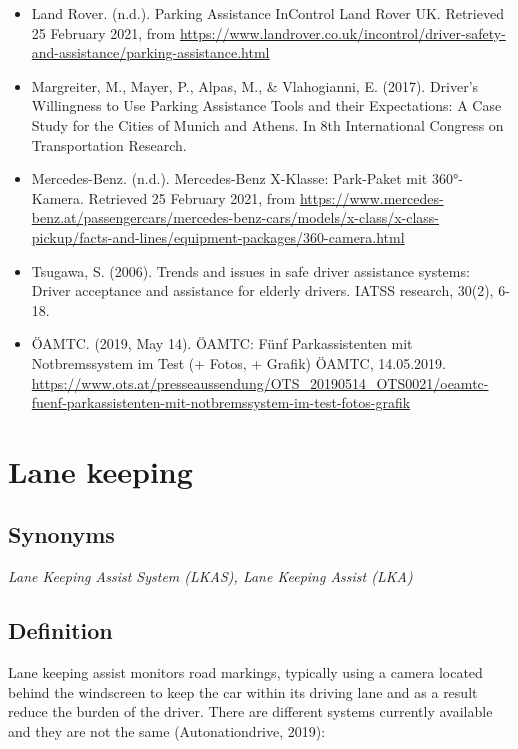 \documentclass[
]{book}
\begin{document}
\begin{itemize}
\item
  Land Rover. (n.d.). Parking Assistance \textbar{} InControl \textbar{} Land Rover UK. Retrieved 25 February 2021, from \url{https://www.landrover.co.uk/incontrol/driver-safety-and-assistance/parking-assistance.html}
\item
  Margreiter, M., Mayer, P., Alpas, M., \& Vlahogianni, E. (2017). Driver's Willingness to Use Parking Assistance Tools and their Expectations: A Case Study for the Cities of Munich and Athens. In 8th International Congress on Transportation Research.
\item
  Mercedes-Benz. (n.d.). Mercedes-Benz X-Klasse: Park-Paket mit 360°-Kamera. Retrieved 25 February 2021, from \url{https://www.mercedes-benz.at/passengercars/mercedes-benz-cars/models/x-class/x-class-pickup/facts-and-lines/equipment-packages/360-camera.html}
\item
  Tsugawa, S. (2006). Trends and issues in safe driver assistance systems: Driver acceptance and assistance for elderly drivers. IATSS research, 30(2), 6-18.
\item
  ÖAMTC. (2019, May 14). ÖAMTC: Fünf Parkassistenten mit Notbremssystem im Test (+ Fotos, + Grafik) \textbar{} ÖAMTC, 14.05.2019. \url{https://www.ots.at/presseaussendung/OTS_20190514_OTS0021/oeamtc-fuenf-parkassistenten-mit-notbremssystem-im-test-fotos-grafik}
\end{itemize}

\hypertarget{lane_keeping}{%
\section{Lane keeping}\label{lane_keeping}}

\hypertarget{synonyms-16}{%
\subsection*{Synonyms}\label{synonyms-16}}

\emph{Lane Keeping Assist System (LKAS), Lane Keeping Assist (LKA)}

\hypertarget{definition-19}{%
\subsection*{Definition}\label{definition-19}}

Lane keeping assist monitors road markings, typically using a camera located behind the windscreen to keep the car within its driving lane and as a result reduce the burden of the driver. There are different systems currently available and they are not the same (Autonationdrive, 2019):
\end{document}
